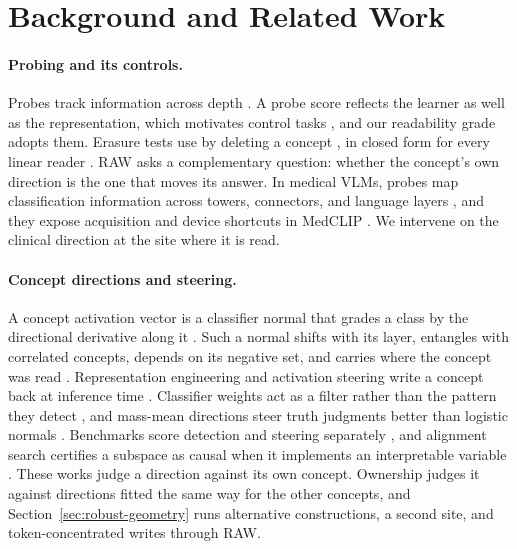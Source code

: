 \section{Background and Related Work}
\label{sec:related}

\paragraph{Probing and its controls.}
Probes track information across depth \citep{alain2017understanding}. A probe score reflects the learner as well as the representation, which motivates control tasks \citep{hewitt2019designing}, and our readability grade adopts them. Erasure tests use by deleting a concept \citep{ravfogel2020null,elazar2021amnesic}, in closed form for every linear reader \citep{belrose2023leace}. RAW asks a complementary question: whether the concept's own direction is the one that moves its answer. In medical VLMs, probes map classification information across towers, connectors, and language layers \citep{zhu2026lost}, and they expose acquisition and device shortcuts in MedCLIP \citep{wang2022medclip,pedersen2026probes}. We intervene on the clinical direction at the site where it is read.

\paragraph{Concept directions and steering.}
A concept activation vector is a classifier normal that grades a class by the directional derivative along it \citep{kim2018tcav}. Such a normal shifts with its layer, entangles with correlated concepts, depends on its negative set, and carries where the concept was read \citep{nicolson2025explaining}. Representation engineering and activation steering write a concept back at inference time \citep{zou2023representation,turner2023steering,panickssery2024caa}. Classifier weights act as a filter rather than the pattern they detect \citep{haufe2014interpretation}, and mass-mean directions steer truth judgments better than logistic normals \citep{marks2024geometry}. Benchmarks score detection and steering separately \citep{wu2025axbench}, and alignment search certifies a subspace as causal when it implements an interpretable variable \citep{geiger2024alignments}. These works judge a direction against its own concept. Ownership judges it against directions fitted the same way for the other concepts, and Section~\ref{sec:robust-geometry} runs alternative constructions, a second site, and token-concentrated writes through RAW.

